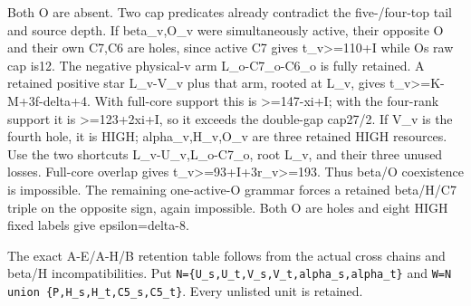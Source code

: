 \documentclass[10pt,a4paper]{article}
\theoremstyle{definition}
\begin{document}
Both O are absent. Two cap predicates already contradict the
five-/four-top tail and source depth. If beta\_\allowbreak{}v,\allowbreak{}O\_\allowbreak{}v were
simultaneously active,\allowbreak{} their opposite O and their own C7,\allowbreak{}C6 are holes,\allowbreak{}
since active C7 gives t\_\allowbreak{}v\textgreater=\allowbreak{}110+\allowbreak{}I while O\textquotesingle s
raw cap is12. The negative physical-v arm L\_\allowbreak{}o-C7\_\allowbreak{}o-C6\_\allowbreak{}o is fully
retained. A retained positive star L\_\allowbreak{}v-V\_\allowbreak{}v plus that arm,\allowbreak{} rooted at
L\_\allowbreak{}v,\allowbreak{} gives t\_\allowbreak{}v\textgreater=\allowbreak{}K-M+\allowbreak{}3f-delta+\allowbreak{}4. With full-core support this
is \textgreater=\allowbreak{}147-xi+\allowbreak{}I; with the four-rank support it is
\textgreater=\allowbreak{}123+\allowbreak{}2xi+\allowbreak{}I,\allowbreak{} so it exceeds the double-gap cap27/2. If V\_\allowbreak{}v is
the fourth hole,\allowbreak{} it is HIGH; alpha\_\allowbreak{}v,\allowbreak{}H\_\allowbreak{}v,\allowbreak{}O\_\allowbreak{}v are three retained HIGH
resources. Use the two shortcuts L\_\allowbreak{}v-U\_\allowbreak{}v,\allowbreak{}L\_\allowbreak{}o-C7\_\allowbreak{}o,\allowbreak{} root L\_\allowbreak{}v,\allowbreak{} and
their three unused losses. Full-core overlap gives
t\_\allowbreak{}v\textgreater=\allowbreak{}93+\allowbreak{}I+\allowbreak{}3r\_\allowbreak{}v\textgreater=\allowbreak{}193. Thus beta/O coexistence is
impossible. The remaining one-active-O grammar forces a retained
beta/H/C7 triple on the opposite sign,\allowbreak{} again impossible. Both O are
holes and eight HIGH fixed labels give epsilon=\allowbreak{}delta-8.

The exact A-E/A-H/B retention table follows from the actual cross chains
and beta/H incompatibilities. Put
\texttt{N=\allowbreak{}\{U\_\allowbreak{}\allowbreak{}s,\allowbreak{}U\_\allowbreak{}\allowbreak{}t,\allowbreak{}V\_\allowbreak{}\allowbreak{}s,\allowbreak{}V\_\allowbreak{}\allowbreak{}t,\allowbreak{}alpha\_\allowbreak{}\allowbreak{}s,\allowbreak{}alpha\_\allowbreak{}\allowbreak{}t\}}
and \texttt{W=\allowbreak{}N union \{P,\allowbreak{}H\_\allowbreak{}\allowbreak{}s,\allowbreak{}H\_\allowbreak{}\allowbreak{}t,\allowbreak{}C5\_\allowbreak{}\allowbreak{}s,\allowbreak{}C5\_\allowbreak{}\allowbreak{}t\}}.
Every unlisted unit is retained.
\end{document}
